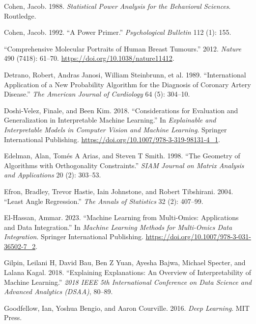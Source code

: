 \documentclass[
  letterpaper,
]{report}
\newlength{\cslhangindent}
\newenvironment{CSLReferences}[2] %
 {\begin{list}{}{%
  \setlength{\itemindent}{0pt}
  \setlength{\leftmargin}{0pt}
  \setlength{\parsep}{0pt}
  \ifodd #1
   \setlength{\leftmargin}{\cslhangindent}
   \setlength{\itemindent}{-1\cslhangindent}
  \fi
  \setlength{\itemsep}{#2\baselineskip}}}
 {\end{list}}
\begin{document}
\begin{CSLReferences}{1}{1}
Cohen, Jacob. 1988. \emph{Statistical Power Analysis for the Behavioral
Sciences}. Routledge.

Cohen, Jacob. 1992. {``A Power Primer.''} \emph{Psychological Bulletin}
112 (1): 155.

{``Comprehensive Molecular Portraits of Human Breast Tumours.''} 2012.
\emph{Nature} 490 (7418): 61--70.
\url{https://doi.org/10.1038/nature11412}.

Detrano, Robert, Andras Janosi, William Steinbrunn, et al. 1989.
{``International Application of a New Probability Algorithm for the
Diagnosis of Coronary Artery Disease.''} \emph{The American Journal of
Cardiology} 64 (5): 304--10.

Doshi-Velez, Finale, and Been Kim. 2018. {``Considerations for
Evaluation and Generalization in Interpretable Machine Learning.''} In
\emph{Explainable and Interpretable Models in Computer Vision and
Machine Learning}. Springer International Publishing.
\url{https://doi.org/10.1007/978-3-319-98131-4_1}.

Edelman, Alan, Tomés A Arias, and Steven T Smith. 1998. {``The Geometry
of Algorithms with Orthogonality Constraints.''} \emph{SIAM Journal on
Matrix Analysis and Applications} 20 (2): 303--53.

Efron, Bradley, Trevor Hastie, Iain Johnstone, and Robert Tibshirani.
2004. {``Least Angle Regression.''} \emph{The Annals of Statistics} 32
(2): 407--99.

El-Hassan, Ammar. 2023. {``Machine Learning from Multi-Omics:
Applications and Data Integration.''} In \emph{Machine Learning Methods
for Multi-Omics Data Integration}. Springer International Publishing.
\url{https://doi.org/10.1007/978-3-031-36502-7_2}.

Gilpin, Leilani H, David Bau, Ben Z Yuan, Ayesha Bajwa, Michael Specter,
and Lalana Kagal. 2018. {``Explaining Explanations: An Overview of
Interpretability of Machine Learning.''} \emph{2018 IEEE 5th
International Conference on Data Science and Advanced Analytics (DSAA)},
80--89.

Goodfellow, Ian, Yoshua Bengio, and Aaron Courville. 2016. \emph{Deep
Learning}. MIT Press.


\end{CSLReferences}
\end{document}
